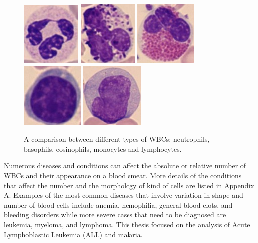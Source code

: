\documentclass[final,a4paper,12pt,english]{UnicaPhdThesis3}
\begin{document}
\begin{figure}[!htbp]
	\centering
	\includegraphics[height=0.125\textheight]{images/crop-Fig2-1}
	\includegraphics[height=0.125\textheight]{images/crop-Fig2-2}
	\includegraphics[height=0.125\textheight]{images/crop-Fig2-3}
	\includegraphics[height=0.125\textheight]{images/crop-Fig2-4}
	\includegraphics[height=0.125\textheight]{images/crop-Fig2-5}
	\caption{\label{fig:leukocytes1}A comparison between different types of WBCs: neutrophils, basophils, eosinophils, monocytes and lymphocytes.}
\end{figure}

Numerous diseases and conditions can affect the absolute or relative number of WBCs and their appearance on a blood smear. More details of the conditions that affect the number and the morphology of kind of cells are listed in Appendix A. Examples of the most common diseases that involve variation in shape and number of blood cells include anemia, hemophilia, general blood clots, and bleeding disorders while more severe cases that need to be diagnosed are leukemia, myeloma, and lymphoma. This thesis focused on the analysis of Acute Lymphoblastic Leukemia (ALL) and malaria.
\end{document}
